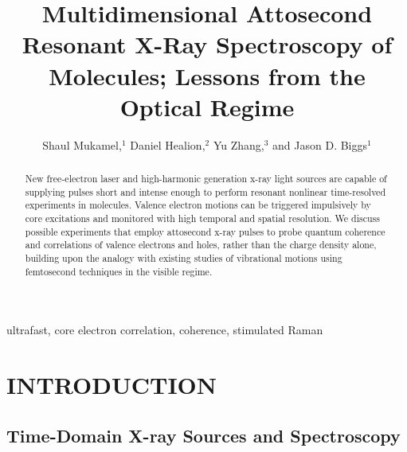 \documentclass{ar-1col}
\begin{document}

\title{Multidimensional Attosecond Resonant X-Ray Spectroscopy of Molecules; Lessons from the Optical Regime}

\author{Shaul Mukamel,$^1$ Daniel Healion,$^2$ Yu Zhang,$^3$ and Jason D. Biggs$^1$%
}

\begin{abstract}
New free-electron laser and high-harmonic generation x-ray light
  sources are capable of supplying pulses short and intense enough to
  perform resonant nonlinear time-resolved experiments in molecules. Valence electron motions can be triggered impulsively by
  core excitations and monitored with high temporal and spatial
  resolution.  We discuss possible experiments that employ attosecond
  x-ray pulses to probe quantum coherence and correlations of valence
  electrons and holes, rather than the charge density alone, building
  upon the analogy with existing studies of vibrational motions using femtosecond techniques in the visible regime. 
\end{abstract}

\begin{keywords}
ultrafast, core electron correlation, coherence, stimulated Raman
\end{keywords}


\maketitle



\section{INTRODUCTION}

\subsection{Time-Domain X-ray Sources and Spectroscopy}
\end{document}
